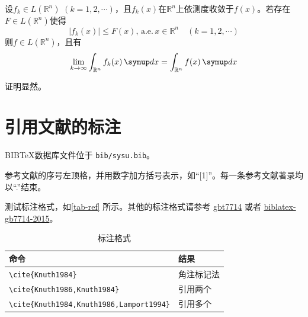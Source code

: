 \begin{corollary}[依测度收敛型控制收敛定理]
    设\(f_k\in L(\mathbb{R}^n)\) \((k = 1,2,\cdots)\)，且\(f_k(x)\)在\(\mathbb{R}^n\)上依测度收敛于\(f(x)\)。若存在\(F\in L(\mathbb{R}^n)\)使得
    \[\left\vert f_k(x)\right\vert \leqslant F(x),\,\text{a.e.}\, x\in\mathbb{R}^n \quad (k = 1,2,\cdots)\]
    则\(f\in L(\mathbb{R}^n)\)，且有
    \[\lim_{k\to\infty}\int_{\mathbb{R}^n} f_k(x)\diff x = \int_{\mathbb{R}^n} f(x)\diff x\]
\end{corollary}

\begin{remark}
    证明显然。
\end{remark}

\section{引用文献的标注}

BIB\TeX 数据库文件位于 \verb|bib/sysu.bib|。

参考文献的序号左顶格，并用数字加方括号表示，如“[1]”。每一条参考文献著录均以“.”结束。

测试标注格式，如\autoref{tab-ref} 所示。其他的标注格式请参考 \href{http://mirrors.ctan.org/biblio/bibtex/contrib/gbt7714/gbt7714.pdf}{gbt7714} 或者
\href{http://mirrors.ctan.org/macros/latex/contrib/biblatex-contrib/biblatex-gb7714-2015/biblatex-gb7714-2015.pdf}{biblatex-gb7714-2015}。

\begin{table}[H]
    \centering
    \caption{标注格式}
    \label{tab-ref}
    \begin{tabular}{ll}
        \toprule
        命令                                            & 结果                                         \\
        \midrule
        \verb|\cite{Knuth1984}|                       & 角注标记法\cite{Knuth1984}                      \\
        \verb|\cite{Knuth1986,Knuth1984}|             & 引用两个\cite{Knuth1986,Knuth1984}             \\
        \verb|\cite{Knuth1984,Knuth1986,Lamport1994}| & 引用多个\cite{Knuth1984,Knuth1986,Lamport1994} \\
        \bottomrule
    \end{tabular}
\end{table}
